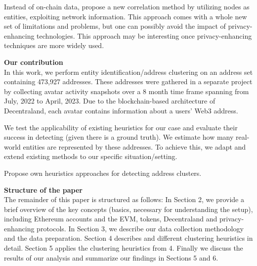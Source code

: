 \documentclass[12pt,a4paper,titlepage,oneside,english]{article}
\begin{document}
Instead of on-chain data, \cite{yu2023} propose a new correlation method by utilizing nodes as entities, exploiting network information. This approach comes with a whole new set of limitations and problems, but one can possibly avoid the impact of privacy-enhancing technologies. This approach may be interesting once privacy-enhancing techniques are more widely used.



\textbf{Our contribution}\\
In this work, we perform entity identification/address clustering on an address set containing 473,927 addresses. 
These addresses were gathered in a separate project by collecting avatar activity snapshots over a 8 month time frame spanning from July, 2022 to April, 2023. Due to the blockchain-based architecture of Decentraland, each avatar contains information about a users' Web3 address. 

We test the applicability of existing heuristics for our case and evaluate their success in detecting (given there is a ground truth). We estimate how many real-world entities are represented by these addresses. To achieve this, we adapt and extend existing methods to our specific situation/setting.

Propose own heuristics approaches for detecting address clusters.


\textbf{Structure of the paper}\\
The remainder of this paper is structured as follows: In Section 2, we provide a brief overview of the key concepts (basics, necessary for understanding the setup), including Ethereum accounts and the EVM, tokens, Decentraland and privacy-enhancing protocols. In Section 3, we describe our data collection methodology and the data preparation. Section 4  describes and different clustering heuristics in detail. Section 5 applies the clustering heuristics from 4. Finally we discuss the results of our analysis and summarize our findings in Sections 5 and 6.
\end{document}
